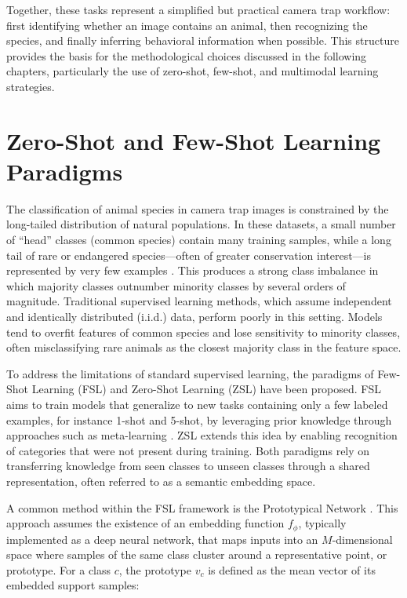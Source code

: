 Together, these tasks represent a simplified but practical camera trap workflow: first identifying whether an image contains an animal, then recognizing the species, and finally inferring behavioral information when possible. This structure provides the basis for the methodological choices discussed in the following chapters, particularly the use of zero-shot, few-shot, and multimodal learning strategies.

\section{Zero-Shot and Few-Shot Learning Paradigms}

The classification of animal species in camera trap images is constrained by the long-tailed distribution of natural populations. In these datasets, a small number of ``head'' classes (common species) contain many training samples, while a long tail of rare or endangered species—often of greater conservation interest—is represented by very few examples \citep{beery2018recognition}. This produces a strong class imbalance in which majority classes outnumber minority classes by several orders of magnitude. Traditional supervised learning methods, which assume independent and identically distributed (i.i.d.) data, perform poorly in this setting. Models tend to overfit features of common species and lose sensitivity to minority classes, often misclassifying rare animals as the closest majority class in the feature space.

To address the limitations of standard supervised learning, the paradigms of Few-Shot Learning (FSL) and Zero-Shot Learning (ZSL) have been proposed. FSL aims to train models that generalize to new tasks containing only a few labeled examples, for instance 1-shot and 5-shot, by leveraging prior knowledge through approaches such as meta-learning \citep{vinyals2016matching}. ZSL extends this idea by enabling recognition of categories that were not present during training. Both paradigms rely on transferring knowledge from seen classes to unseen classes through a shared representation, often referred to as a semantic embedding space.

A common method within the FSL framework is the Prototypical Network \citep{snell2017prototypical}. This approach assumes the existence of an embedding function $f_\phi$, typically implemented as a deep neural network, that maps inputs into an $M$-dimensional space where samples of the same class cluster around a representative point, or prototype. For a class $c$, the prototype $v_c$ is defined as the mean vector of its embedded support samples:

